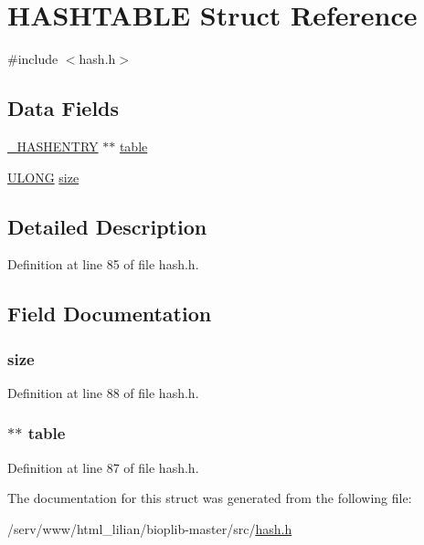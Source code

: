 \hypertarget{struct_h_a_s_h_t_a_b_l_e}{\section{H\-A\-S\-H\-T\-A\-B\-L\-E Struct Reference}
\label{struct_h_a_s_h_t_a_b_l_e}
}


{\ttfamily \#include $<$hash.\-h$>$}

\subsection*{Data Fields}
\begin{DoxyCompactItemize}
\item 
\hyperlink{hash_8h_a88dcba233ac5cfe9249d0e6309b3178a}{\-\_\-\-H\-A\-S\-H\-E\-N\-T\-R\-Y} $\ast$$\ast$ \hyperlink{struct_h_a_s_h_t_a_b_l_e_a6bb6d237633464e3661171cd1ac3821f}{table}
\item 
\hyperlink{_sys_defs_8h_af632da489ebc3708ec3ab6791ee53fa4}{U\-L\-O\-N\-G} \hyperlink{struct_h_a_s_h_t_a_b_l_e_a44126abe10a39da97e696b62a2048eb1}{size}
\end{DoxyCompactItemize}


\subsection{Detailed Description}


Definition at line 85 of file hash.\-h.



\subsection{Field Documentation}
\hypertarget{struct_h_a_s_h_t_a_b_l_e_a44126abe10a39da97e696b62a2048eb1}{
\subsubsection[{size}]{ size}}\label{struct_h_a_s_h_t_a_b_l_e_a44126abe10a39da97e696b62a2048eb1}


Definition at line 88 of file hash.\-h.

\hypertarget{struct_h_a_s_h_t_a_b_l_e_a6bb6d237633464e3661171cd1ac3821f}{
\subsubsection[{table}]{$\ast$$\ast$ table}}\label{struct_h_a_s_h_t_a_b_l_e_a6bb6d237633464e3661171cd1ac3821f}


Definition at line 87 of file hash.\-h.



The documentation for this struct was generated from the following file\-:\begin{DoxyCompactItemize}
\item 
/serv/www/html\-\_\-lilian/bioplib-\/master/src/\hyperlink{hash_8h}{hash.\-h}\end{DoxyCompactItemize}
